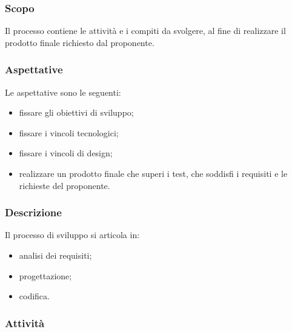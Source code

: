 	\subsubsection{Scopo}
	Il processo contiene le attività e i compiti da svolgere, al fine di realizzare 
	il prodotto finale richiesto dal proponente.
	
	\subsubsection{Aspettative}
	Le aspettative sono le seguenti:
		\begin{itemize}
			\item fissare gli obiettivi di sviluppo;
			\item fissare i vincoli tecnologici;
			\item fissare i vincoli di design;
			\item realizzare un prodotto finale che superi i test, che soddisfi i 
				requisiti e le richieste del proponente.
		\end{itemize}
		
	\subsubsection{Descrizione}
	Il processo di sviluppo si articola in:
		\begin{itemize}
			\item analisi dei requisiti;
			\item progettazione;
			\item codifica.
		\end{itemize}
		
	\subsubsection{Attività}
